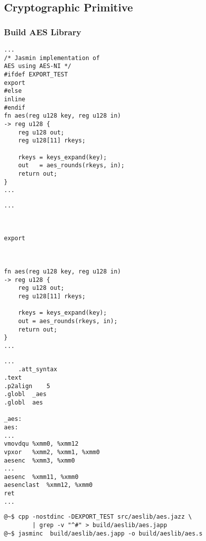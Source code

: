 \subsection{Cryptographic Primitive}
\subsubsection{Build AES Library}

\begin{center}

\end{center}
\vfill
\begin{center}
\begin{minipage}{.3\textwidth}
\begin{lstlisting}[style=jasmin, caption={aes.jazz}, captionpos=t]
...
/* Jasmin implementation of 
AES using AES-NI */
#ifdef EXPORT_TEST
export
#else
inline
#endif
fn aes(reg u128 key, reg u128 in) 
-> reg u128 {
	reg u128 out;
	reg u128[11] rkeys;
	
	rkeys = keys_expand(key);
	out   = aes_rounds(rkeys, in);
	return out;
}
...
\end{lstlisting}
\end{minipage}\hfill
\begin{minipage}{.3\textwidth}
\begin{lstlisting}[style=jasmin, caption={aes.japp}, captionpos=t]
...



export



fn aes(reg u128 key, reg u128 in)
-> reg u128 {
	reg u128 out;
	reg u128[11] rkeys;
	
	rkeys = keys_expand(key);
	out = aes_rounds(rkeys, in);
	return out;
}
...
\end{lstlisting}
\end{minipage}\hfill
\begin{minipage}{.3\textwidth}
\begin{lstlisting}[style=jasmin, caption={aes.s}, captionpos=t]
...
	.att_syntax
.text
.p2align	5
.globl	_aes
.globl	aes

_aes:
aes:
...
vmovdqu	%xmm0, %xmm12
vpxor	%xmm2, %xmm1, %xmm0
aesenc	%xmm3, %xmm0
...
aesenc	%xmm11, %xmm0
aesenclast	%xmm12, %xmm0
ret
...
\end{lstlisting}
\end{minipage}
\end{center}
\vfill
\begin{lstlisting}[style=normal]
@~$ cpp -nostdinc -DEXPORT_TEST src/aeslib/aes.jazz \
		| grep -v "^#" > build/aeslib/aes.japp
@~$ jasminc  build/aeslib/aes.japp -o build/aeslib/aes.s
\end{lstlisting}
\newpage
